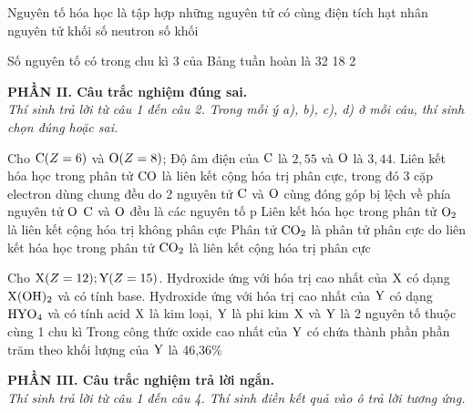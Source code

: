 \documentclass[11pt,a4paper]{article}
\begin{document}
\begin{ex}
Nguyên tố hóa học là tập hợp những nguyên tử có cùng
\choice
{\True điện tích hạt nhân}
{nguyên tử khối}
{số neutron}
{số khối}
\end{ex}
\begin{ex}
Số nguyên tố có trong chu kì 3 của Bảng tuần hoàn là
\choice
{}
{32}
{18}
{2}
\end{ex}
\vspace{4pt}
\noindent
{\color{mainGreen}\textbf{\large PHẦN II. Câu trắc nghiệm đúng sai.}}\\
\textit{\small Thí sinh trả lời từ câu 1 đến câu 2. Trong mỗi ý a), b), c), d) ở mỗi câu, thí sinh chọn đúng hoặc sai.}
\vspace{2pt}

\begin{ex}
Cho $\ce{C} (Z=6)$ và $\ce{O} (Z=8)$; Độ âm điện của $\ce{C}$ là $2,55$ và $\ce{O}$ là $3,44$.
\choiceTF
{Liên kết hóa học trong phân tử $\ce{CO}$ là liên kết cộng hóa trị phân cực, trong đó 3 cặp electron dùng chung đều do 2 nguyên tử $\ce{C}$ và $\ce{O}$ cùng đóng góp bị lệch về phía nguyên tử $\ce{O}$}
{\True $\ce{C}$ và $\ce{O}$ đều là các nguyên tố p}
{\True Liên kết hóa học trong phân tử $\ce{O2}$ là liên kết cộng hóa trị không phân cực}
{Phân tử $\ce{CO2}$ là phân tử phân cực do liên kết hóa học trong phân tử $\ce{CO2}$ là liên kết cộng hóa trị phân cực}
\end{ex}
\begin{ex}
Cho $\ce{X} (Z=12); \ce{Y} (Z=15)$.
\choiceTF
{Hydroxide ứng với hóa trị cao nhất của $\ce{X}$ có dạng $\ce{X(OH)2}$ và có tính base. Hydroxide ứng với hóa trị cao nhất của $\ce{Y}$ có dạng $\ce{HYO4}$ và có tính acid}
{\True $\ce{X}$ là kim loại, $\ce{Y}$ là phi kim}
{\True $\ce{X}$ và $\ce{Y}$ là 2 nguyên tố thuộc cùng 1 chu kì}
{Trong công thức oxide cao nhất của $\ce{Y}$ có chứa thành phần phần trăm theo khối lượng của $\ce{Y}$ là 46,36\%}
\end{ex}
\vspace{4pt}
\noindent
{\color{mainGreen}\textbf{\large PHẦN III. Câu trắc nghiệm trả lời ngắn.}}\\
\textit{\small Thí sinh trả lời từ câu 1 đến câu 4. Thí sinh điền kết quả vào ô trả lời tương ứng.}
\vspace{2pt}
\end{document}
